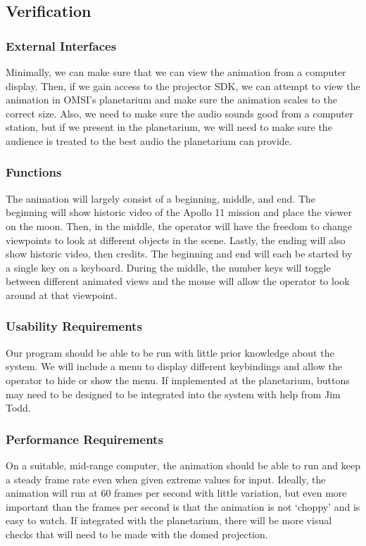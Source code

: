 \documentclass[onecolumn, draftclsnofoot,10pt, compsoc]{IEEEtran}
\begin{document}
\subsection{Verification}
    \subsubsection{External Interfaces}
    Minimally, we can make sure that we can view the animation from a computer display. Then, if we gain access to the projector SDK, we can attempt to view the animation in OMSI's planetarium and make sure the animation scales to the correct size. Also, we need to make sure the audio sounds good from a computer station, but if we present in the planetarium, we will need to make sure the audience is treated to the best audio the planetarium can provide. 
    \subsubsection{Functions}
    The animation will largely consist of a beginning, middle, and end. The beginning will show historic video of the Apollo 11 mission and place the viewer on the moon. Then, in the middle, the operator will have the freedom to change viewpoints to look at different objects in the scene. Lastly, the ending will also show historic video, then credits.
    The beginning and end will each be started by a single key on a keyboard. During the middle, the number keys will toggle between different animated views and the mouse will allow the operator to look around at that viewpoint. 
    \subsubsection{Usability Requirements}
    Our program should be able to be run with little prior knowledge about the system. We will include a menu to display different keybindings and allow the operator to hide or show the menu. If implemented at the planetarium, buttons may need to be designed to be integrated into the system with help from Jim Todd.  
    \subsubsection{Performance Requirements}
    On a suitable, mid-range computer, the animation should be able to run and keep a steady frame rate even when given extreme values for input. Ideally, the animation will run at 60 frames per second with little variation, but even more important than the frames per second is that the animation is not `choppy' and is easy to watch. If integrated with the planetarium, there will be more visual checks that will need to be made with the domed projection. 
\end{document}
